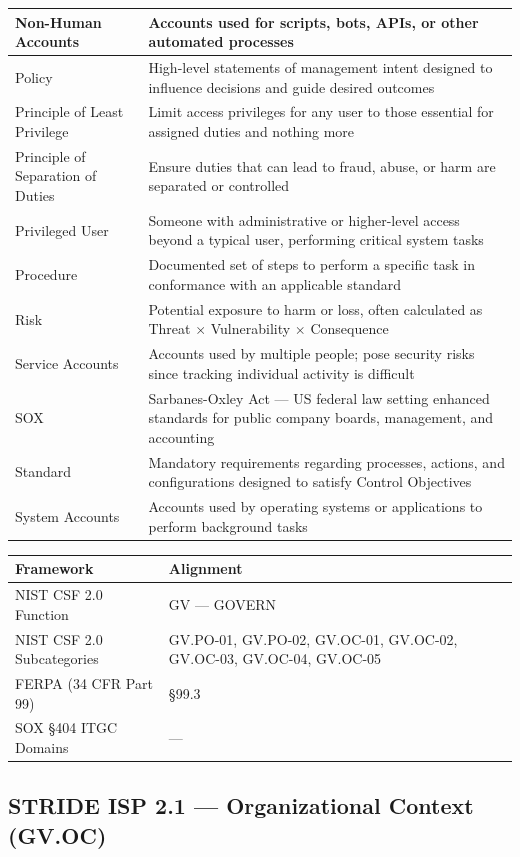 \documentclass[11pt,landscape]{article}
\begin{document}
\begin{longtable}{|p{3.5cm}|p{6in}|}
\hline
Non-Human Accounts & Accounts used for scripts, bots, APIs, or other automated processes \\
\hline
Policy & High-level statements of management intent designed to influence decisions and guide desired outcomes \\
\hline
Principle of Least Privilege & Limit access privileges for any user to those essential for assigned duties and nothing more \\
\hline
Principle of Separation of Duties & Ensure duties that can lead to fraud, abuse, or harm are separated or controlled \\
\hline
Privileged User & Someone with administrative or higher-level access beyond a typical user, performing critical system tasks \\
\hline
Procedure & Documented set of steps to perform a specific task in conformance with an applicable standard \\
\hline
Risk & Potential exposure to harm or loss, often calculated as Threat $\times$ Vulnerability $\times$ Consequence \\
\hline
Service Accounts & Accounts used by multiple people; pose security risks since tracking individual activity is difficult \\
\hline
SOX & Sarbanes-Oxley Act --- US federal law setting enhanced standards for public company boards, management, and accounting \\
\hline
Standard & Mandatory requirements regarding processes, actions, and configurations designed to satisfy Control Objectives \\
\hline
System Accounts & Accounts used by operating systems or applications to perform background tasks \\
\hline
\end{longtable}

\begin{tabularx}{\textwidth}{|p{4cm}|X|}
\hline
\rowcolor{headgray} \textbf{Framework} & \textbf{Alignment} \\
\hline
NIST CSF 2.0 Function & GV --- GOVERN \\
\hline
NIST CSF 2.0 Subcategories & GV.PO-01, GV.PO-02, GV.OC-01, GV.OC-02, GV.OC-03, GV.OC-04, GV.OC-05 \\
\hline
FERPA (34 CFR Part 99) & §99.3 \\
\hline
SOX §404 ITGC Domains & --- \\
\hline
\end{tabularx}


\subsection{\textcolor{strideblue}{STRIDE ISP 2.1} --- Organizational Context (GV.OC)}
\label{pol:ISP21}
\end{document}
